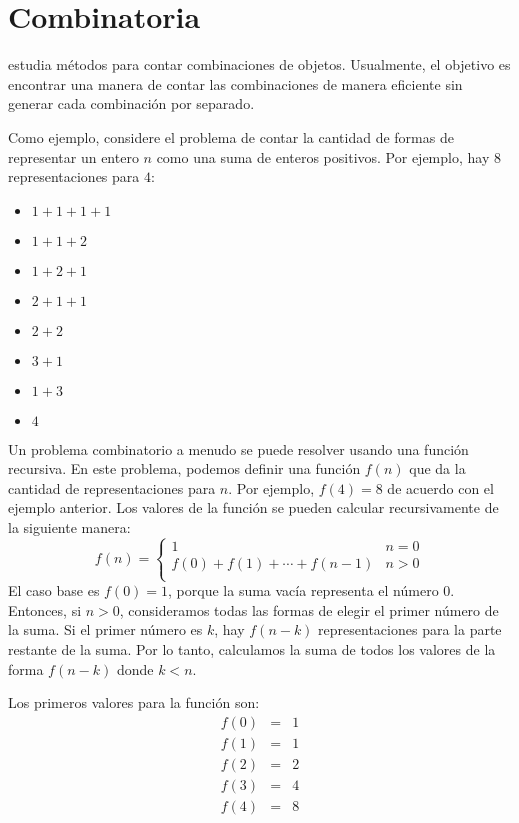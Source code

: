 \chapter{Combinatoria}


 estudia métodos para contar combinaciones de objetos.
Usualmente, el objetivo es encontrar una manera de
contar las combinaciones de manera eficiente
sin generar cada combinación por separado.

Como ejemplo, considere el problema
de contar la cantidad de formas de
representar un entero $n$ como una suma de enteros positivos.
Por ejemplo, hay 8 representaciones
para $4$:
\begin{multicols}{2}
\begin{itemize}
\item $1+1+1+1$
\item $1+1+2$
\item $1+2+1$
\item $2+1+1$
\item $2+2$
\item $3+1$
\item $1+3$
\item $4$
\end{itemize}
\end{multicols}

Un problema combinatorio a menudo se puede resolver
usando una función recursiva.
En este problema, podemos definir una función $f(n)$
que da la cantidad de representaciones para $n$.
Por ejemplo, $f(4)=8$ de acuerdo con el ejemplo anterior.
Los valores de la función
se pueden calcular recursivamente de la siguiente manera:
\begin{equation*}
    f(n) = \begin{cases}
               1               & n = 0\\
               f(0)+f(1)+\cdots+f(n-1) & n > 0\\
           \end{cases}
\end{equation*}
El caso base es $f(0)=1$,
porque la suma vacía representa el número 0.
Entonces, si $n>0$, consideramos todas las formas de
elegir el primer número de la suma.
Si el primer número es $k$,
hay $f(n-k)$ representaciones
para la parte restante de la suma.
Por lo tanto, calculamos la suma de todos los valores
de la forma $f(n-k)$ donde $k<n$.

Los primeros valores para la función son:
\[
\begin{array}{lcl}
f(0) & = & 1 \\
f(1) & = & 1 \\
f(2) & = & 2 \\
f(3) & = & 4 \\
f(4) & = & 8 \\
\end{array}
\]


